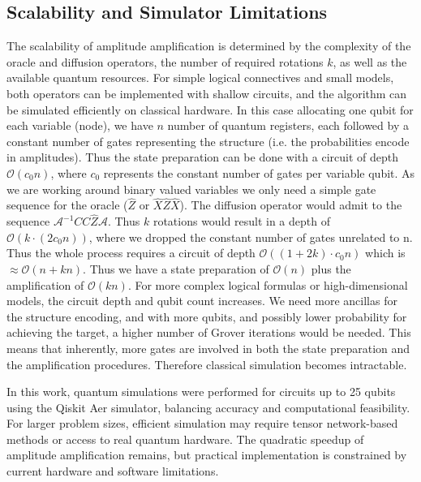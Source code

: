\documentclass[encoding=utf8,british]{tumphthesis}
\begin{document}
        \subsection{Scalability and Simulator Limitations}
        The scalability of amplitude amplification is determined by the complexity of the oracle and diffusion operators, the number of required rotations $k$, 
        as well as the available quantum resources. For simple logical connectives and small models, both operators can be implemented with shallow 
        circuits, and the algorithm can be simulated efficiently on classical hardware. In this case allocating one qubit for each variable 
        (node), we have $n$ number of quantum registers, each followed by a constant number of gates representing the structure (i.e. the probabilities encode in amplitudes).
        Thus the state preparation can be done with a circuit of depth $\mathcal{O}(c_0 n)$, where $c_0$ represents the constant number of gates per variable qubit. 
        As we are working around binary valued variables we only need a simple gate sequence for the oracle ($\hat{Z}$ or $\hat{X}\hat{Z}\hat{X}$). The diffusion operator would 
        admit to the sequence $\mathcal{A}^{-1} CC\hat{Z} \mathcal{A}$. Thus $k$ rotations would result in a depth of $\mathcal{O}(k \cdot (2c_0n))$, where we dropped the 
        constant number of gates unrelated to n. Thus the whole process requires a circuit of depth $\mathcal{O}((1 + 2k) \cdot c_0 n)$
        which is $\approx \mathcal{O}(n + kn)$. Thus we have a state preparation of $\mathcal{O}(n)$ plus the amplification of $\mathcal{O}(kn)$.
        For more complex logical formulas or high-dimensional models, the circuit depth and qubit count increases. We need more ancillas for the structure encoding, and with more qubits, and 
        possibly lower probability for achieving the target, a higher number of Grover iterations would be needed. This means that inherently, more gates are involved in both the state preparation 
        and the amplification procedures. Therefore classical simulation becomes intractable.

        In this work, quantum simulations were performed for circuits up to 25 qubits using the Qiskit Aer simulator, balancing accuracy and 
        computational feasibility. For larger problem sizes, efficient simulation may require tensor network-based methods or access to real 
        quantum hardware. The quadratic speedup of amplitude amplification remains, but practical implementation is constrained by current 
        hardware and software limitations.
    
\end{document}
